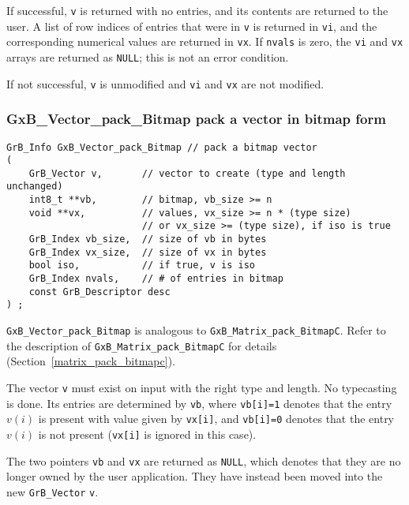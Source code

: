 \documentclass[12pt]{article}
\begin{document}
If successful, \verb'v' is returned with no entries, and its contents are
returned to the user.
A list of row indices of entries that were in
\verb'v' is returned in \verb'vi', and the corresponding numerical values are
returned in \verb'vx'.  If \verb'nvals' is zero, the \verb'vi' and \verb'vx'
arrays are returned as \verb'NULL'; this is not an error condition.

If not successful, \verb'v' is unmodified and \verb'vi' and \verb'vx' are
not modified.

\newpage
\subsubsection{{\sf GxB\_Vector\_pack\_Bitmap} pack a vector in bitmap form}
\label{vector_pack_bitmap}

\begin{mdframed}[userdefinedwidth=6in]
{\footnotesize
\begin{verbatim}
GrB_Info GxB_Vector_pack_Bitmap // pack a bitmap vector
(
    GrB_Vector v,       // vector to create (type and length unchanged)
    int8_t **vb,        // bitmap, vb_size >= n
    void **vx,          // values, vx_size >= n * (type size)
                        // or vx_size >= (type size), if iso is true
    GrB_Index vb_size,  // size of vb in bytes
    GrB_Index vx_size,  // size of vx in bytes
    bool iso,           // if true, v is iso
    GrB_Index nvals,    // # of entries in bitmap
    const GrB_Descriptor desc
) ;
\end{verbatim}
} \end{mdframed}

\noindent
\verb'GxB_Vector_pack_Bitmap' is analogous to
\verb'GxB_Matrix_pack_BitmapC'.  Refer to the description of
\verb'GxB_Matrix_pack_BitmapC' for details
(Section~\ref{matrix_pack_bitmapc}).

The vector \verb'v' must
exist on input with the right type and length.  No typecasting is done.
Its entries are determined by \verb'vb', where \verb'vb[i]=1' denotes that
the entry $v(i)$ is present with value given by \verb'vx[i]', and
\verb'vb[i]=0' denotes that the entry $v(i)$ is not present (\verb'vx[i]' is
ignored in this case).

The two pointers \verb'vb' and \verb'vx' are returned as \verb'NULL', which
denotes that they are no longer owned by the user application.  They have
instead been moved into the new \verb'GrB_Vector' \verb'v'.
\end{document}
